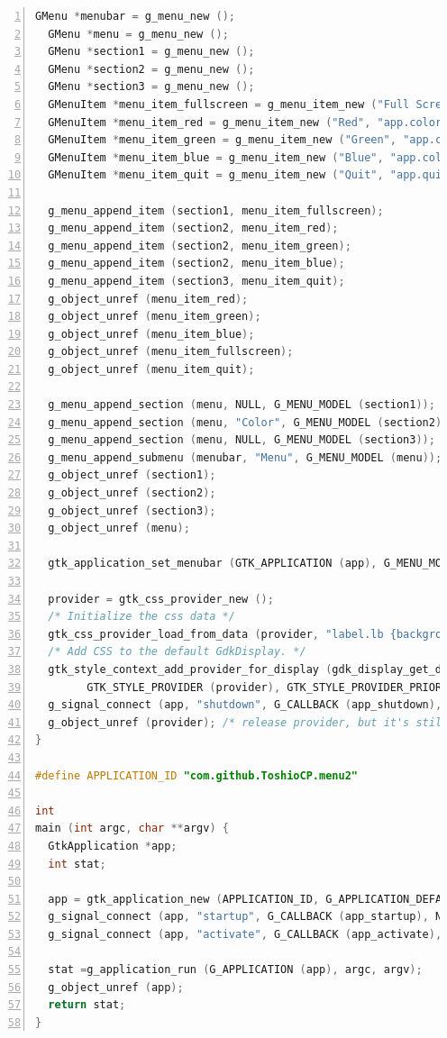 \begin{lstlisting}[language=C, numbers=left]
  GMenu *menubar = g_menu_new ();
  GMenu *menu = g_menu_new ();
  GMenu *section1 = g_menu_new ();
  GMenu *section2 = g_menu_new ();
  GMenu *section3 = g_menu_new ();
  GMenuItem *menu_item_fullscreen = g_menu_item_new ("Full Screen", "win.fullscreen");
  GMenuItem *menu_item_red = g_menu_item_new ("Red", "app.color::red");
  GMenuItem *menu_item_green = g_menu_item_new ("Green", "app.color::green");
  GMenuItem *menu_item_blue = g_menu_item_new ("Blue", "app.color::blue");
  GMenuItem *menu_item_quit = g_menu_item_new ("Quit", "app.quit");

  g_menu_append_item (section1, menu_item_fullscreen);
  g_menu_append_item (section2, menu_item_red);
  g_menu_append_item (section2, menu_item_green);
  g_menu_append_item (section2, menu_item_blue);
  g_menu_append_item (section3, menu_item_quit);
  g_object_unref (menu_item_red);
  g_object_unref (menu_item_green);
  g_object_unref (menu_item_blue);
  g_object_unref (menu_item_fullscreen);
  g_object_unref (menu_item_quit);

  g_menu_append_section (menu, NULL, G_MENU_MODEL (section1));
  g_menu_append_section (menu, "Color", G_MENU_MODEL (section2));
  g_menu_append_section (menu, NULL, G_MENU_MODEL (section3));
  g_menu_append_submenu (menubar, "Menu", G_MENU_MODEL (menu));
  g_object_unref (section1);
  g_object_unref (section2);
  g_object_unref (section3);
  g_object_unref (menu);

  gtk_application_set_menubar (GTK_APPLICATION (app), G_MENU_MODEL (menubar));

  provider = gtk_css_provider_new ();
  /* Initialize the css data */
  gtk_css_provider_load_from_data (provider, "label.lb {background-color: red;}", -1);
  /* Add CSS to the default GdkDisplay. */
  gtk_style_context_add_provider_for_display (gdk_display_get_default (),
        GTK_STYLE_PROVIDER (provider), GTK_STYLE_PROVIDER_PRIORITY_APPLICATION);
  g_signal_connect (app, "shutdown", G_CALLBACK (app_shutdown), provider);
  g_object_unref (provider); /* release provider, but it's still alive because the display owns it */
}

#define APPLICATION_ID "com.github.ToshioCP.menu2"

int
main (int argc, char **argv) {
  GtkApplication *app;
  int stat;

  app = gtk_application_new (APPLICATION_ID, G_APPLICATION_DEFAULT_FLAGS);
  g_signal_connect (app, "startup", G_CALLBACK (app_startup), NULL);
  g_signal_connect (app, "activate", G_CALLBACK (app_activate), NULL);

  stat =g_application_run (G_APPLICATION (app), argc, argv);
  g_object_unref (app);
  return stat;
}
\end{lstlisting}

